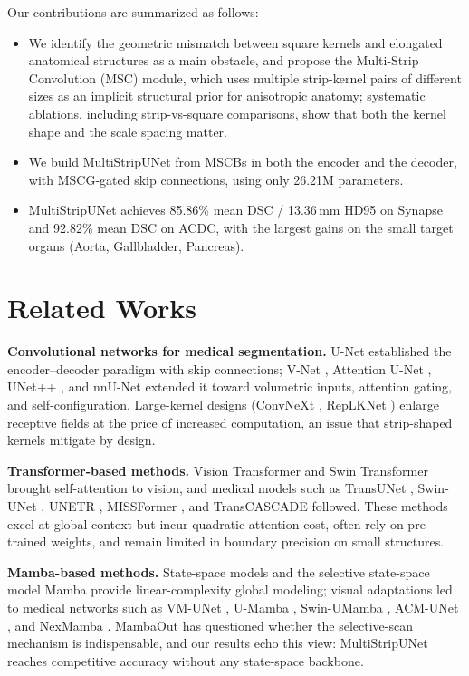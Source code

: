 \documentclass{llncs}
\begin{document}
Our contributions are summarized as follows:
\begin{itemize}
\item We identify the geometric mismatch between square kernels and elongated anatomical structures as a main obstacle, and propose the Multi-Strip Convolution (MSC) module, which uses multiple strip-kernel pairs of different sizes as an implicit structural prior for anisotropic anatomy; systematic ablations, including strip-vs-square comparisons, show that both the kernel shape and the scale spacing matter.
\item We build MultiStripUNet from MSCBs in both the encoder and the decoder, with MSCG-gated skip connections, using only 26.21M parameters.
\item MultiStripUNet achieves 85.86\% mean DSC / 13.36\,mm HD95 on Synapse and 92.82\% mean DSC on ACDC, with the largest gains on the small target organs (Aorta, Gallbladder, Pancreas).
\end{itemize}

\section{Related Works}

\textbf{Convolutional networks for medical segmentation.} U-Net \cite{ronneberger2015unet} established the encoder--decoder paradigm with skip connections; V-Net \cite{milletari2016v}, Attention U-Net \cite{oktay2018attention}, UNet++ \cite{zhou2018unet++}, and nnU-Net \cite{isensee2021nnu} extended it toward volumetric inputs, attention gating, and self-configuration. Large-kernel designs (ConvNeXt \cite{liu2022convnext}, RepLKNet \cite{ding2022scaling}) enlarge receptive fields at the price of increased computation, an issue that strip-shaped kernels mitigate by design.

\textbf{Transformer-based methods.} Vision Transformer \cite{dosovitskiy2020vit} and Swin Transformer \cite{liu2021swin} brought self-attention to vision, and medical models such as TransUNet \cite{chen2021transunet}, Swin-UNet \cite{cao2021swinunet}, UNETR \cite{hatamizadeh2022unetr}, MISSFormer \cite{huang2022missformer}, and TransCASCADE \cite{rahman2023transcascade} followed. These methods excel at global context but incur quadratic attention cost, often rely on pre-trained weights, and remain limited in boundary precision on small structures.

\textbf{Mamba-based methods.} State-space models \cite{fu2022hungry,gu2020hippo,gu2021efficiently} and the selective state-space model Mamba \cite{gu2023mamba} provide linear-complexity global modeling; visual adaptations \cite{liu2024vmamba,zhu2024vim} led to medical networks such as VM-UNet \cite{ruan2024vmunet}, U-Mamba \cite{ma2024umamba}, Swin-UMamba \cite{liu2024swinumamba}, ACM-UNet \cite{acmunet2025}, and NexMamba \cite{nexmamba2026}. MambaOut \cite{yu2024mambaout} has questioned whether the selective-scan mechanism is indispensable, and our results echo this view: MultiStripUNet reaches competitive accuracy without any state-space backbone.
\end{document}
